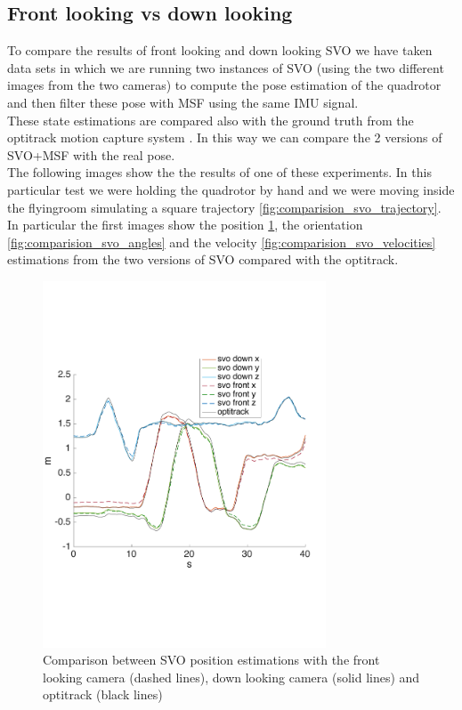\subsection{Front looking vs down looking}
To compare the results of front looking and down looking SVO we have taken data sets in which we are running two instances of SVO (using the two different images from the two cameras) to compute the pose estimation of the quadrotor and then filter these pose with MSF using the same IMU signal. \\
These state estimations are compared also with the ground truth from the optitrack motion capture system \cite{optitrack}. In this way we can compare the 2 versions of SVO+MSF with the real pose.\\
The following images show the the results of one of these experiments. In this particular test we were holding the quadrotor by hand and we were moving inside the flyingroom simulating a square trajectory \ref{fig:comparision_svo_trajectory}.\\
In particular the first images show the position \ref{fig:comparision_svo_position}, the orientation  \ref{fig:comparision_svo_angles} and the velocity \ref{fig:comparision_svo_velocities} estimations from the two versions of SVO compared with the optitrack.
 
\begin{figure}[!ht]
    \centering
    \includegraphics[width=0.75\textwidth]{img/comparision_between_two_svo_and_opti_position.pdf}
    \caption{Comparison between SVO position estimations with the front looking camera (dashed lines), down looking camera (solid lines) and optitrack (black lines) }
    \label{fig:comparision_svo_position}
\end{figure}


